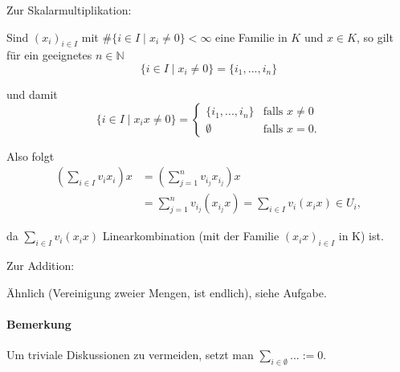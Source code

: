 Zur Skalarmultiplikation:
        \begin{addmargin}[25pt]{0pt}
	Sind $(x_i)_{i\in I}$ mit $\#\{i\in I \mid x_i \neq 0\}<\infty$ eine Familie in $ K $ und $x\in K$, so gilt für ein geeignetes $n\in \mathbb{N}$
		\[ \{i\in I\mid x_i \neq 0\} = \{i_1, ... , i_n\} \]

	und damit
	\begin{equation*}
		\{i\in I\mid x_ix\neq 0\} =
		\begin{cases}
			\{{i_1,...,i_n\}}& \text{falls }x \neq 0\\
			\emptyset& \text{falls }x = 0.
		\end{cases}
	\end{equation*}

	Also folgt
	\begin{align*}
		(\sum_{i\in I}v_i x_i) x &= (\sum_{j=1}^{n} v_{i_j}x_{i_j})x\\
		&= \sum_{j=1}^{n} v_{i_j}(x_{i_j}x) = \sum_{i\in I} v_i(x_ix) \in U_i,
	\end{align*}

	da $\sum_{i\in I} v_i(x_ix)$ Linearkombination (mit der Familie $(x_ix)_{i\in I}$ in K) ist.
	\end{addmargin}

Zur Addition:
        \begin{addmargin}[25pt]{0pt}
            Ähnlich (Vereinigung zweier Mengen, ist endlich), siehe Aufgabe.
	\end{addmargin}
	
\paragraph{Bemerkung}
	Um triviale Diskussionen zu vermeiden, setzt man $\sum_{i\in \emptyset} ...:=0$.
